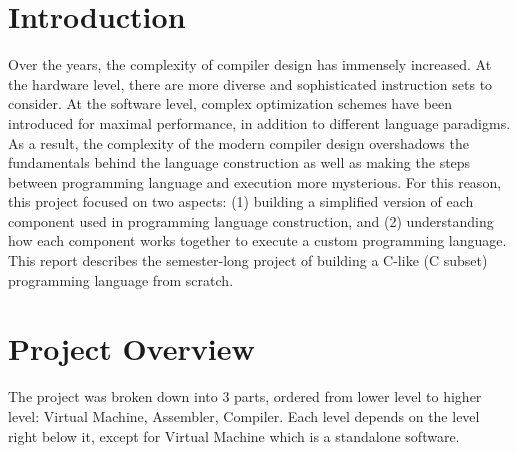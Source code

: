 \documentclass[manuscript,screen,nonacm]{acmart}
\begin{document}
\section{Introduction}
Over the years, the complexity of compiler design has immensely increased. At the hardware level, there are more diverse and sophisticated instruction sets to consider. At the software level, complex optimization schemes have been introduced for maximal performance, in addition to different language paradigms. As a result, the complexity of the modern compiler design overshadows the fundamentals behind the language construction as well as making the steps between programming language and execution more mysterious. For this reason, this project focused on two aspects: (1) building a simplified version of each component used in programming language construction, and (2) understanding how each component works together to execute a custom programming language. This report describes the semester-long project of building a C-like (C subset) programming language from scratch. 

\section{Project Overview}
The project was broken down into 3 parts, ordered from lower level to higher level: Virtual Machine, Assembler, Compiler. Each level depends on the level right below it, except for Virtual Machine which is a standalone software.
\end{document}
